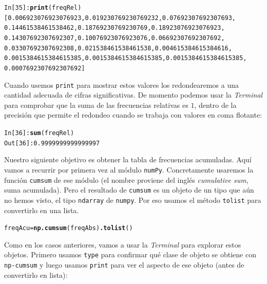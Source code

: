 \documentclass[10pt,a4paper]{article}\usepackage[]{graphicx}\usepackage[]{color}
\makeatletter
\newcommand{\hlnum}[1]{\textcolor[rgb]{0.686,0.059,0.569}{#1}}%
\newcommand{\hlopt}[1]{\textcolor[rgb]{0,0,0}{#1}}%
\newcommand{\hlstd}[1]{\textcolor[rgb]{0.345,0.345,0.345}{#1}}%
\newcommand{\hlkwd}[1]{\textcolor[rgb]{0.737,0.353,0.396}{\textbf{#1}}}%
\newenvironment{kframe}{%
 \def\at@end@of@kframe{}%
 \ifinner\ifhmode%
  \def\at@end@of@kframe{\end{minipage}}%
  \begin{minipage}{\columnwidth}%
 \fi\fi%
 \def\FrameCommand##1{\hskip\@totalleftmargin \hskip-\fboxsep
 \colorbox{shadecolor}{##1}\hskip-\fboxsep
     \hskip-\linewidth \hskip-\@totalleftmargin \hskip\columnwidth}%
 \MakeFramed {\advance\hsize-\width
   \@totalleftmargin\z@ \linewidth\hsize
   \@setminipage}}%
 {\par\unskip\endMakeFramed%
 \at@end@of@kframe}
\newenvironment{knitrout}{}{} %
\makeatother
\begin{document}
\begin{knitrout}
\color{fgcolor}\begin{kframe}
\begin{alltt}
In [35]: \hlkwd{print}(freqRel)
[0.006923076923076923, 0.019230769230769232, 0.07692307692307693,
0.14461538461538462, 0.18769230769230769, 0.18923076923076923,
0.14307692307692307, 0.10076923076923076, 0.06692307692307692,
0.03307692307692308, 0.021538461538461538, 0.004615384615384616,
0.0015384615384615385, 0.0015384615384615385, 0.0015384615384615385,
0.0007692307692307692]
\end{alltt}
\end{kframe}
\end{knitrout}
Cuando usemos {\tt print} para mostrar estos valores los redondearemos a una cantidad adecuada de cifras significativas. De momento podemos usar la {\em Terminal} para comprobar que la suma de las frecuencias relativas es $1$, dentro de la precisión que permite el redondeo cuando se trabaja con valores en coma flotante:
\begin{knitrout}
\color{fgcolor}\begin{kframe}
\begin{alltt}
\hlstd{In [}\hlnum{36}\hlstd{]}\hlopt{:} \hlkwd{sum}\hlstd{(freqRel)}
\hlstd{Out[}\hlnum{36}\hlstd{]}\hlopt{:} \hlnum{0.9999999999999997}
\end{alltt}
\end{kframe}
\end{knitrout}
Nuestro siguiente objetivo es obtener la tabla de frecuencias acumuladas. Aquí vamos a recurrir por primera vez al módulo {\tt numPy}. Concretamente usaremos la función {\tt cumsum} de ese módulo (el nombre proviene del inglés {\em cumulative sum}, suma acumulada). Pero el resultado de {\tt cumsum} es un objeto de un tipo que aún no hemos visto, el tipo {\tt ndarray} de {\tt numpy}. Por eso usamos el método {\tt tolist} para convertirlo en una lista.
\begin{knitrout}
\color{fgcolor}\begin{kframe}
\begin{alltt}
freqAcu = \hlkwd{np.cumsum}(freqAbs)\hlkwd{.tolist}()
\end{alltt}
\end{kframe}
\end{knitrout}
Como en los casos anteriores, vamos a usar la {\em Terminal} para explorar estos objetos. Primero usamos {\tt type} para confirmar qué clase de objeto se obtiene con {\tt np-cumsum} y luego usamos {\tt print} para ver el aspecto de ese objeto (antes de convertirlo en lista):
\end{document}
